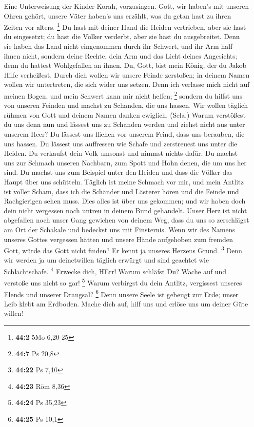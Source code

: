  Eine Unterweisung der Kinder Korah, vorzusingen.
 Gott, wir haben's mit unseren Ohren gehört, unsere Väter
haben's uns erzählt, was du getan hast zu ihren Zeiten vor alters.
\footnote{\textbf{44:2} 5Mo 6,20-25}  Du hast mit deiner
Hand die Heiden vertrieben, aber sie hast du eingesetzt; du hast die
Völker verderbt, aber sie hast du ausgebreitet.  Denn sie
haben das Land nicht eingenommen durch ihr Schwert, und ihr Arm half
ihnen nicht, sondern deine Rechte, dein Arm und das Licht deines
Angesichts; denn du hattest Wohlgefallen an ihnen.  Du,
Gott, bist mein König, der du Jakob Hilfe verheißest. 
Durch dich wollen wir unsere Feinde zerstoßen; in deinem Namen wollen
wir untertreten, die sich wider uns setzen.  Denn ich
verlasse mich nicht auf meinen Bogen, und mein Schwert kann mir nicht
helfen; \footnote{\textbf{44:7} Ps 20,8}  sondern du
hilfst uns von unseren Feinden und machst zu Schanden, die uns hassen.
 Wir wollen täglich rühmen von Gott und deinem Namen
danken ewiglich. (Sela.)  Warum verstößest du uns denn
nun und lässest uns zu Schanden werden und ziehst nicht aus unter
unserem Heer?  Du lässest uns fliehen vor unserem Feind,
dass uns berauben, die uns hassen.  Du lässest uns
auffressen wie Schafe und zerstreuest uns unter die Heiden.
 Du verkaufst dein Volk umsonst und nimmst nichts dafür.
 Du machst uns zur Schmach unseren Nachbarn, zum Spott
und Hohn denen, die um uns her sind.  Du machst uns zum
Beispiel unter den Heiden und dass die Völker das Haupt über uns
schütteln.  Täglich ist meine Schmach vor mir, und mein
Antlitz ist voller Scham,  dass ich die Schänder und
Lästerer hören und die Feinde und Rachgierigen sehen muss.
 Dies alles ist über uns gekommen; und wir haben doch
dein nicht vergessen noch untreu in deinem Bund gehandelt.
 Unser Herz ist nicht abgefallen noch unser Gang gewichen
von deinem Weg,  dass du uns so zerschlägst am Ort der
Schakale und bedeckst uns mit Finsternis.  Wenn wir des
Namens unseres Gottes vergessen hätten und unsere Hände aufgehoben zum
fremden Gott,  würde das Gott nicht finden? Er kennt ja
unseres Herzens Grund. \footnote{\textbf{44:22} Ps 7,10} 
Denn wir werden ja um deinetwillen täglich erwürgt und sind geachtet wie
Schlachtschafe. \footnote{\textbf{44:23} Röm 8,36} 
Erwecke dich, HErr! Warum schläfst Du? Wache auf und verstoße uns nicht
so gar! \footnote{\textbf{44:24} Ps 35,23}  Warum
verbirgst du dein Antlitz, vergissest unseres Elends und unserer
Drangsal? \footnote{\textbf{44:25} Ps 10,1}  Denn unsere
Seele ist gebeugt zur Erde; unser Leib klebt am Erdboden.
 Mache dich auf, hilf uns und erlöse uns um deiner Güte
willen!

